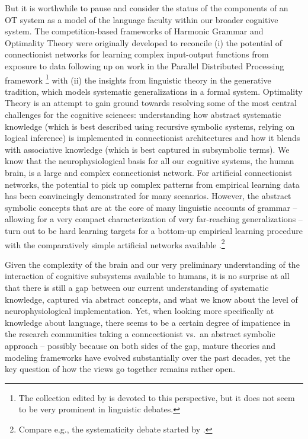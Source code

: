 \documentclass[output=paper,hidelinks]{langscibook}
\begin{document}
But it is worthwhile to pause and consider the status of the components of an OT system as a model of the language faculty within our broader cognitive system.
The competition-based frameworks of Harmonic Grammar \citep{Legendre-etal-1990} and Optimality Theory \citep{PrinceSmolensky1993,PrinceSmolensky2004} were originally developed to reconcile (i) the potential of connectionist networks for learning complex input-output functions from exposure to data following up on work in the Parallel Distributed Processing framework \citep{RumelhartMcClelland1986}\footnote{The collection edited by \citet{SmolenskyLegendre2006} is devoted to this perspective, but it does not seem to be very prominent in linguistic debates.} with (ii) the insights from linguistic theory in the generative tradition, which models systematic generalizations in a formal system.  Optimality Theory is an attempt to gain ground towards resolving some of the most central challenges for the cognitive sciences: understanding how abstract systematic knowledge (which is best described using recursive symbolic systems, relying on logical inference) is implemented in connectionist architectures and how it blends with associative knowledge (which is best captured in subsymbolic terms). We know that the neurophysiological basis for all our cognitive systems, the human brain, is a large and complex connectionist network. For artificial connectionist networks, the potential to pick up complex patterns from empirical learning data has been convincingly demonstrated for many scenarios. %
However, the abstract symbolic concepts that are at the core of many linguistic accounts of grammar -- allowing for a very compact characterization of very far-reaching generalizations -- turn out to be hard learning targets for a bottom-up empirical learning procedure with the comparatively simple artificial networks available \citep{Marcus2001}.\footnote{Compare e.g., the systematicity debate started by \citet{FodorMcLaughlin1990} \citep{sep-connectionism}.} %


Given the complexity of the brain and our very preliminary understanding of the interaction of cognitive subsystems available to humans, it is no surprise at all that there is still a gap between our current understanding of systematic knowledge, captured via abstract concepts,  and what we know about the level of neurophysiological implementation. Yet, when looking more specifically at knowledge about language, there seems to be a certain degree of impatience in the research communities taking a conncectionist vs.\ an abstract symbolic approach -- possibly because on both sides of the gap, mature theories and modeling frameworks have evolved substantially over the past decades, yet the key question of how the views go together remains rather open.
\end{document}
